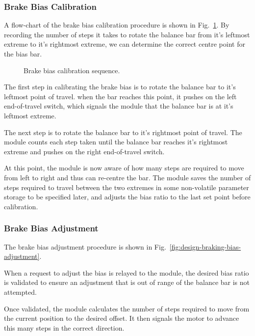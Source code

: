\subsubsection{Brake Bias Calibration}

A flow-chart of the brake bias calibration procedure is shown in Fig.\ \ref{fig:brake_bias_calibration_flow}. By recording the number of steps it takes to rotate the balance bar from it's leftmost extreme to it's rightmost extreme, we can determine the correct centre point for the bias bar. 

\begin{figure}[H]
\centering

\caption{Brake bias calibration sequence.}
\label{fig:brake_bias_calibration_flow}
\end{figure}

The first step in calibrating the brake bias is to rotate the balance bar to it's leftmost point of travel. when the bar reaches this point, it pushes on the left end-of-travel switch, which signals the module that the balance bar is at it's leftmost extreme. 

The next step is to rotate the balance bar to it's rightmost point of travel. The module counts each step taken until the balance bar reaches it's rightmost extreme and pushes on the right end-of-travel switch.

At this point, the module is now aware of how many steps are required to move from left to right and thus can re-centre the bar. The module saves the number of steps required to travel between the two extremes in some non-volatile parameter storage to be specified later, and adjusts the bias ratio to the last set point before calibration.

\subsubsection{Brake Bias Adjustment}

The brake bias adjustment procedure is shown in Fig.\ \ref{fig:design-braking-bias-adjustment}. 

When a request to adjust the bias is relayed to the module, the desired bias ratio is validated to ensure an adjustment that is out of range of the balance bar is not attempted. 

Once validated, the module calculates the number of steps required to move from the current position to the desired offset. It then signals the motor to advance this many steps in the correct direction.

